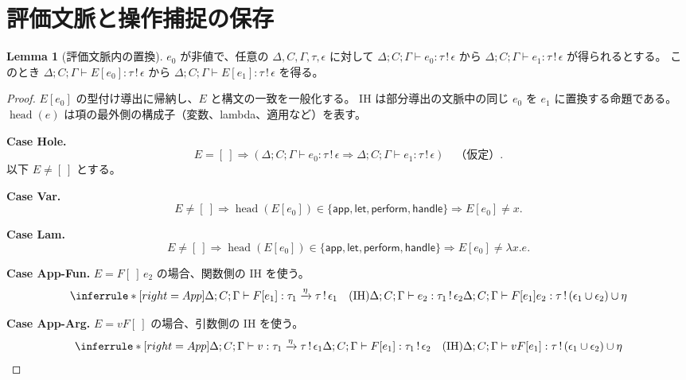 \documentclass[a4paper,11pt]{article}
\theoremstyle{definition}
\newtheorem{lemma}[definition]{Lemma}
\newenvironment{Case}[1]{\par\smallskip\noindent\textbf{Case #1.}\enspace\ignorespaces}{\par}
\newcommand{\arr}[3]{#1\xrightarrow{#2}#3}
\newcommand{\jj}[6]{#1;#2;#3\vdash #4:#5\,!\,#6}
\newcommand{\J}[3]{\jj{\Delta}{C}{\Gamma}{#1}{#2}{#3}}
\newcommand{\proofspace}{\Needspace{16\baselineskip}}
\begin{document}
\section{評価文脈と操作捕捉の保存}
\label{app:operation}
\proofspace
\begin{samepage}
\begin{lemma}[評価文脈内の置換]\label{lem:ctx-replace}
$e_0$ が非値で、任意の $\Delta,C,\Gamma,\tau,\epsilon$ に対して
$\J{e_0}\tau\epsilon$ から $\J{e_1}\tau\epsilon$ が得られるとする。
このとき $\J{E[e_0]}\tau\epsilon$ から $\J{E[e_1]}\tau\epsilon$ を得る。
\end{lemma}
\end{samepage}
\nopagebreak[4]
\begin{proof}\leavevmode\label{proof:lem:ctx-replace}
$E[e_0]$ の型付け導出に帰納し、$E$ と構文の一致を一般化する。
IH は部分導出の文脈中の同じ $e_0$ を $e_1$ に置換する命題である。
$\operatorname{head}(e)$ は項の最外側の構成子（変数、lambda、適用など）を表す。

\begin{Case}{Hole}
\[E=[\ ]\Longrightarrow
 (\jj\Delta C\Gamma{e_0}\tau\epsilon
  \Longrightarrow\jj\Delta C\Gamma{e_1}\tau\epsilon)\quad\text{（仮定）}.\]
以下 $E\ne[\ ]$ とする。
\end{Case}

\begin{Case}{Var}
\[E\ne[\ ]\Longrightarrow\operatorname{head}(E[e_0])\in
 \{\mathsf{app},\mathsf{let},\mathsf{perform},\mathsf{handle}\}
 \Longrightarrow E[e_0]\ne x.\]
\end{Case}

\begin{Case}{Lam}
\[E\ne[\ ]\Longrightarrow\operatorname{head}(E[e_0])\in
 \{\mathsf{app},\mathsf{let},\mathsf{perform},\mathsf{handle}\}
 \Longrightarrow E[e_0]\ne \lambda x.e.\]
\end{Case}

\begin{Case}{App-Fun}
$E=F[\ ]\,e_2$ の場合、関数側の IH を使う。
\[
\inferrule*[right=App]{\jj{\Delta}{C}{\Gamma}{F[e_1]}{\arr{\tau_1}\eta\tau}{\epsilon_1}\quad(\mathrm{IH})\\\jj{\Delta}{C}{\Gamma}{e_2}{\tau_1}{\epsilon_2}}{\jj{\Delta}{C}{\Gamma}{F[e_1]e_2}{\tau}{(\epsilon_1\cup\epsilon_2)\cup\eta}}
\]
\end{Case}

\begin{Case}{App-Arg}
$E=vF[\ ]$ の場合、引数側の IH を使う。
\[
\inferrule*[right=App]{\jj{\Delta}{C}{\Gamma}{v}{\arr{\tau_1}\eta\tau}{\epsilon_1}\\\jj{\Delta}{C}{\Gamma}{F[e_1]}{\tau_1}{\epsilon_2}\quad(\mathrm{IH})}{\jj{\Delta}{C}{\Gamma}{vF[e_1]}{\tau}{(\epsilon_1\cup\epsilon_2)\cup\eta}}
\]
\end{Case}


\end{proof}
\end{document}

